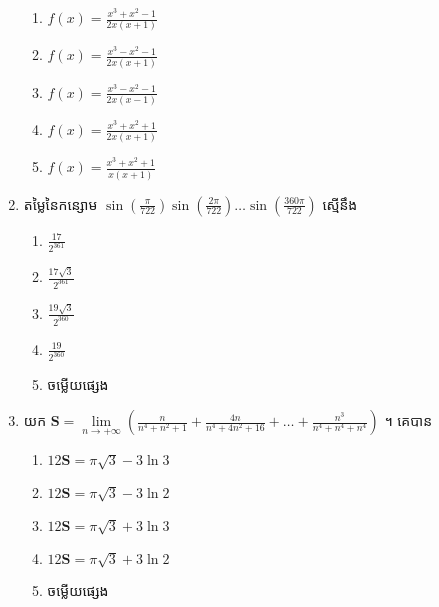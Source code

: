 \documentclass[12pt, a4paper]{article}
\begin{document}
\begin{enumerate}[m]
\begin{enumerate}[k,3]
		\item $f(x)=\frac{x^3+x^2-1}{2x(x+1)}$
		\item $f(x)=\frac{x^3-x^2-1}{2x(x+1)}$
		\item $f(x)=\frac{x^3-x^2-1}{2x(x-1)}$
		\item $f(x)=\frac{x^3+x^2+1}{2x(x+1)}$
		\item $f(x)=\frac{x^3+x^2+1}{x(x+1)}$
	\end{enumerate}
	{\color{blue}\hrulefill}
	\item តម្លៃនៃកន្សោម $\sin\left(\frac{\pi}{722}\right)\sin\left(\frac{2\pi}{722}\right)\dots\sin\left(\frac{360\pi}{722}\right)$ ស្មើនឹង
	\begin{enumerate}[k,5]
		\item $\frac{17}{2^{361}}$
		\item $\frac{17\sqrt{3}}{2^{361}}$
		\item $\frac{19\sqrt{3}}{2^{360}}$
		\item $\frac{19}{2^{360}}$
		\item ចម្លើយផ្សេង
	\end{enumerate}
	{\color{blue}\hrulefill}
	\item យក $\mathbf{S}=\lim\limits_{n\to+\infty}\left(\frac{n}{n^4+n^2+1}+\frac{4n}{n^4+4n^2+16}+\dots+\frac{n^3}{n^4+n^4+n^4}\right)$ ។ គេបាន
	\begin{enumerate}[k,3]
		\item $12\mathbf{S}=\pi\sqrt{3}-3\ln3$
		\item $12\mathbf{S}=\pi\sqrt{3}-3\ln2$
		\item $12\mathbf{S}=\pi\sqrt{3}+3\ln3$
		\item $12\mathbf{S}=\pi\sqrt{3}+3\ln2$
		\item ចម្លើយផ្សេង
	\end{enumerate}
	{\color{blue}\hrulefill}
\end{enumerate}
\makeads
\newpage
\maketitle\koc
{\color{blue}\hrulefill}
\end{document}
